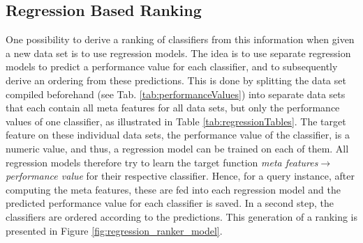 \subsection{Regression Based Ranking}
One possibility to derive a ranking of classifiers from this information when given a new data set is to use regression models. The idea is to use separate regression models to predict a performance value for each classifier, and to subsequently derive an ordering from these predictions. This is done by splitting the data set compiled beforehand (see Tab. \ref{tab:performanceValues}) into separate data sets that each contain all meta features for all data sets, but only the performance values of one classifier, as illustrated in Table \ref{tab:regressionTables}. The target feature on these individual data sets, the performance value of the classifier, is a numeric value, and thus, a regression model can be trained on each of them. All regression models therefore try to learn the target function \textit{meta features}$\rightarrow$\textit{performance value} for their respective classifier. Hence, for a query instance, after computing the meta features, these are fed into each regression model and the predicted performance value for each classifier is saved. In a second step, the classifiers are ordered according to the predictions. This generation of a ranking is presented in Figure \ref{fig:regression_ranker_model}.


